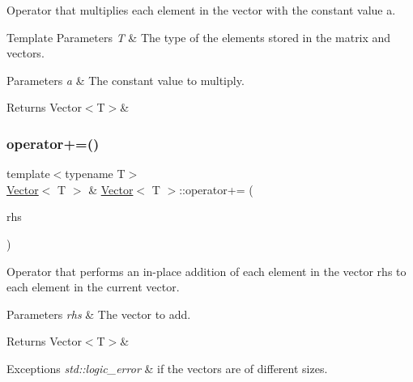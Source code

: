 Operator that multiplies each element in the vector with the constant value {\ttfamily a}. 


\begin{DoxyTemplParams}{Template Parameters}
{\em T} & The type of the elements stored in the matrix and vectors. \\
\hline
\end{DoxyTemplParams}

\begin{DoxyParams}{Parameters}
{\em a} & The constant value to multiply. \\
\hline
\end{DoxyParams}
\begin{DoxyReturn}{Returns}
Vector$<$\+T$>$\& 
\end{DoxyReturn}
\mbox{\label{classVector_a0cdad8a65e9dd1ef60afaf32aa547f9e}} 
\subsubsection{\texorpdfstring{operator+=()}{operator+=()}\hspace{0.1cm}{\footnotesize\ttfamily [1/2]}}
{\footnotesize\ttfamily template$<$typename T$>$ \\
\mbox{\hyperlink{classVector}{Vector}}$<$ T $>$ \& \mbox{\hyperlink{classVector}{Vector}}$<$ T $>$\+::operator+= (\begin{DoxyParamCaption}\item[{const \mbox{\hyperlink{classVector}{Vector}}$<$ T $>$ \&}]{rhs }\end{DoxyParamCaption})\hspace{0.3cm}{\ttfamily [inline]}}



Operator that performs an in-\/place addition of each element in the vector {\ttfamily rhs} to each element in the current vector. 


\begin{DoxyParams}{Parameters}
{\em rhs} & The vector to add. \\
\hline
\end{DoxyParams}
\begin{DoxyReturn}{Returns}
Vector$<$\+T$>$\&
\end{DoxyReturn}

\begin{DoxyExceptions}{Exceptions}
{\em std\+::logic\+\_\+error} & if the vectors are of different sizes. \\
\hline
\end{DoxyExceptions}
\mbox{\label{classVector_a5650df0775f0677f76259cd3f474dded}} 
